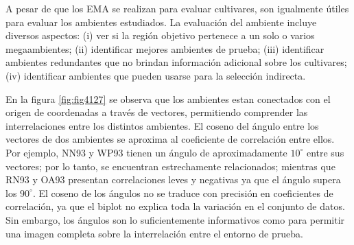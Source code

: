 
A pesar de que los EMA se realizan para evaluar cultivares, son igualmente útiles para evaluar los ambientes estudiados. La evaluación del ambiente incluye diversos aspectos: (i) ver si la región objetivo pertenece a un solo o varios megaambientes; (ii) identificar mejores ambientes de prueba; (iii) identificar ambientes redundantes que no brindan información adicional sobre los cultivares; (iv) identificar ambientes que pueden usarse para la selección indirecta.

En la figura \ref{fig:fig4127} se observa que los ambientes estan conectados con el origen de coordenadas a través de vectores, permitiendo comprender las interrelaciones entre los distintos ambientes. El coseno del ángulo entre los vectores de dos ambientes se aproxima al coeficiente de correlación entre ellos. Por ejemplo, NN93 y WP93 tienen un ángulo de aproximadamente $10^{\circ}$ entre sus vectores; por lo tanto, se encuentran estrechamente relacionados; mientras que RN93 y OA93 presentan correlaciones leves y negativas ya que el ángulo supera los $90^{\circ}$. El coseno de los ángulos no se traduce con precisión en coeficientes de correlación, ya que el biplot no explica toda la variación en el conjunto de datos. Sin embargo, los ángulos son lo suficientemente informativos como para permitir una imagen completa sobre la interrelación entre el entorno de prueba.

